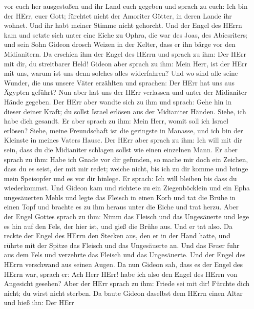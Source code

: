 vor euch her ausgestoßen und ihr Land euch gegeben  und
sprach zu euch: Ich bin der HErr, euer Gott; fürchtet nicht der Amoriter
Götter, in deren Lande ihr wohnet. Und ihr habt meiner Stimme nicht
gehorcht.  Und der Engel des HErrn kam und setzte sich
unter eine Eiche zu Ophra, die war des Joas, des Abiesriters; und sein
Sohn Gideon drosch Weizen in der Kelter, dass er ihn bärge vor den
Midianitern.  Da erschien ihm der Engel des HErrn und
sprach zu ihm: Der HErr mit dir, du streitbarer Held! 
Gideon aber sprach zu ihm: Mein Herr, ist der HErr mit uns, warum ist
uns denn solches alles widerfahren? Und wo sind alle seine Wunder, die
uns unsere Väter erzählten und sprachen: Der HErr hat uns aus Ägypten
geführt? Nun aber hat uns der HErr verlassen und unter der Midianiter
Hände gegeben.  Der HErr aber wandte sich zu ihm und
sprach: Gehe hin in dieser deiner Kraft; du sollst Israel erlösen aus
der Midianiter Händen. Siehe, ich habe dich gesandt.  Er
aber sprach zu ihm: Mein Herr, womit soll ich Israel erlösen? Siehe,
meine Freundschaft ist die geringste in Manasse, und ich bin der
Kleinste in meines Vaters Hause.  Der HErr aber sprach zu
ihm: Ich will mit dir sein, dass du die Midianiter schlagen sollst wie
einen einzelnen Mann.  Er aber sprach zu ihm: Habe ich
Gnade vor dir gefunden, so mache mir doch ein Zeichen, dass du es seist,
der mit mir redet;  weiche nicht, bis ich zu dir komme und
bringe mein Speisopfer und es vor dir hinlege. Er sprach: Ich will
bleiben bis dass du wiederkommst.  Und Gideon kam und
richtete zu ein Ziegenböcklein und ein Epha ungesäuerten Mehls und legte
das Fleisch in einen Korb und tat die Brühe in einen Topf und brachte es
zu ihm heraus unter die Eiche und trat herzu.  Aber der
Engel Gottes sprach zu ihm: Nimm das Fleisch und das Ungesäuerte und
lege es hin auf den Fels, der hier ist, und gieß die Brühe aus. Und er
tat also.  Da reckte der Engel des HErrn den Stecken aus,
den er in der Hand hatte, und rührte mit der Spitze das Fleisch und das
Ungesäuerte an. Und das Feuer fuhr aus dem Fels und verzehrte das
Fleisch und das Ungesäuerte. Und der Engel des HErrn verschwand aus
seinen Augen.  Da nun Gideon sah, dass es der Engel des
HErrn war, sprach er: Ach Herr HErr! habe ich also den Engel des HErrn
von Angesicht gesehen?  Aber der HErr sprach zu ihm: Friede
sei mit dir! Fürchte dich nicht; du wirst nicht sterben. 
Da baute Gideon daselbst dem HErrn einen Altar und hieß ihn: Der HErr
